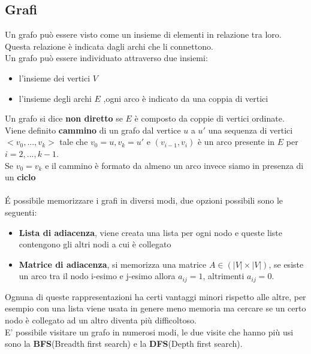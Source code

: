 \documentclass[]{article}
\begin{document}
\subsection{Grafi}
Un grafo può essere visto come un insieme di elementi in relazione tra loro.\\
Questa relazione è indicata dagli archi che li connettono.\\
Un grafo può essere individuato attraverso due insiemi:
\begin{itemize}
\item l'insieme dei vertici $V$
\item l'insieme degli archi $E$ ,ogni arco è indicato da una coppia di vertici
\end{itemize}
Un grafo si dice \textbf{non diretto} se $E$ è composto da coppie di vertici ordinate.\\
Viene definito \textbf{cammino} di un grafo dal vertice $u$ a $u'$ una sequenza di vertici $<v_0, ... , v_k>$ tale che $v_0 = u,v_k=u'$ e $(v_{i-1}, v_i)$ è un arco presente in $E$ per $i = 2,..., k-1$.\\
Se $v_0 = v_k$ e il cammino è formato da almeno un arco invece siamo in presenza di un \textbf{ciclo}
\\\\
\'E possibile memorizzare i grafi in diversi modi, due opzioni possibili sono le seguenti:
\begin{itemize}
\item \textbf{Lista di adiacenza}, viene creata una lista per ogni nodo e queste liste contengono gli altri nodi a cui è collegato
\item \textbf{Matrice di adiacenza}, si memorizza una matrice $A \in (|V| \times |V|)$, se esiste un arco tra il nodo i-esimo e j-esimo allora $a_{ij} = 1$, altrimenti $a_{ij} = 0$. 
\end{itemize}
Ognuna di queste rappresentazioni ha certi vantaggi minori rispetto alle altre, per esempio con una lista viene usata in genere meno memoria ma cercare se un certo nodo è collegato ad un altro diventa più difficoltoso.\\ 
E' possibile visitare un grafo in numerosi modi, le due visite che hanno più usi sono la \textbf{BFS}(Breadth first search) e la \textbf{DFS}(Depth first search).\\
\end{document}
